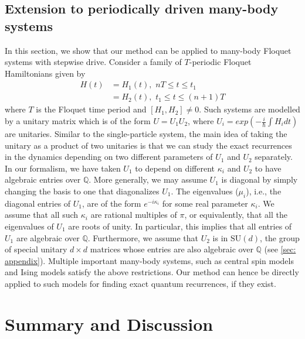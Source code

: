 \documentclass[a4paper,onecolumn,accepted=2026-04-08,10pt]{quantumarticle}
\theoremstyle{definition}
\begin{document}
\subsection{Extension to periodically driven many-body systems}\label{sec: applications many-body }

In this section, we show that our method can be applied to many-body Floquet systems with stepwise drive. Consider a family of $T$-periodic Floquet Hamiltonians given by
\begin{align}  
\label{eq:QKT_Hamiltonian}
 H(t) & = H_1(t), \,\, nT \leq t \leq t_1 \\
  \nonumber  & = H_2(t), \,\, t_1 \leq t \leq (n+1)T
\end{align}
where $T$ is the Floquet time period and $[H_1,H_2] \neq 0$. Such systems are modelled by a unitary matrix which is of the form $U = U_1 U_2$, where $U_i = exp(-\frac{i}{\hbar}\int H_i dt)$ are unitaries. 
Similar to the single-particle system, the main idea of taking the unitary as a product of two unitaries is that we can study the exact recurrences in the dynamics depending on two different parameters of $U_1$ and $U_2$ separately.
In our formalism, we have taken $U_1$ to depend on different $\kappa_i$ and $U_2$ to have algebraic entries over $\mathbb{Q}$. 
More generally, we may assume $U_1$ is diagonal by simply changing the basis to one that diagonalizes $U_1$. The eigenvalues ($\mu_i$), i.e., the diagonal entries of $U_1$, are of the form $e^{-i \kappa_i}$ for some real parameter $\kappa_i$. We assume that all such $\kappa_i$ are rational multiples of $\pi$, or equivalently, that all the eigenvalues of $U_1$ are roots of unity. In particular, this implies that all entries of $U_1$ are algebraic over $\mathbb{Q}$. Furthermore, we assume that $U_2$ is in $\mathrm{SU}(d)$, the group of special unitary $d \times d$ matrices whose entries are also algebraic over ${\mathbb{Q}}$ (see \ref{sec: appendix}). Multiple important many-body systems, such as central spin models \cite{biswas_2025_the} and Ising models \cite{bukov_many_body_2021} satisfy the above restrictions. Our method can hence be directly applied to such models for finding exact quantum recurrences, if they exist.


\section{Summary and Discussion}\label{sec: discussion}
\end{document}
